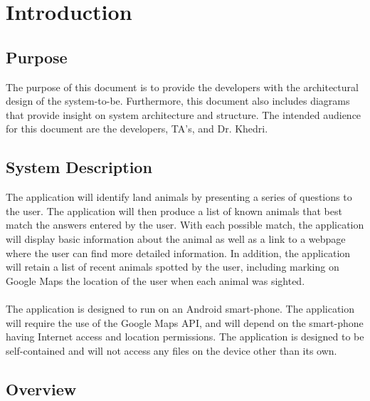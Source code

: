 \documentclass[]{article}
\begin{document}
\tableofcontents
\cleardoublepage
{}

\section{Introduction}
\label{sec:introduction}


\subsection{Purpose}
\label{sub:purpose}

The purpose of this document is to provide the developers with the architectural design of the system-to-be. Furthermore, this document also includes diagrams that provide insight on system architecture and structure. The intended audience for this document are the developers, TA's, and Dr. Khedri.


\subsection{System Description}
\label{sub:system_description}

The application will identify land animals by presenting a series of questions to the user. The application will then produce a list of known animals that best match the answers entered by the user. With each possible match, the application will display basic information about the animal as well as a link to a webpage where the user can find more detailed information. In addition, the application will retain a list of recent animals spotted by the user, including marking on Google Maps the location of the user when each animal was sighted.
\\
\\
The application is designed to run on an Android smart-phone. The application will require the use of the Google Maps API, and will depend on the smart-phone having Internet access and location permissions. The application is designed to be self-contained and will not access any files on the device other than its own.


\subsection{Overview}
\label{sub:overview}
\end{document}
